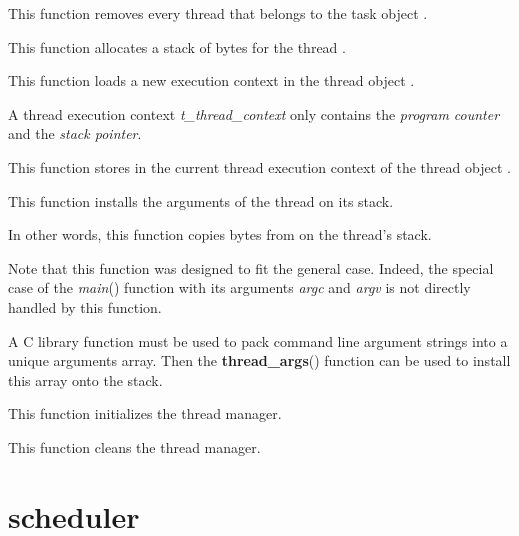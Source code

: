 	 {
	   This function removes every thread that belongs to the
	   task object .
	 }

	 {
	   This function allocates a stack of  bytes
	   for the thread .
	 }

	 {
	   This function loads a new execution context in the thread
	   object .

	   A thread execution context \textit{t\_thread\_context}
	   only contains the \textit{program counter} and the
	   \textit{stack pointer}.
	 }

	 {
	   This function stores in  the current
	   thread execution context of the thread object .
	 }

	 {
	   This function installs the arguments of the thread 
	   on its stack.

	   In other words, this function copies  bytes
	   from  on the thread's stack.

	   Note that this function was designed to fit the general case.
	   Indeed, the special case of the \textit{main}() function
	   with its arguments \textit{argc} and \textit{argv} is not
	   directly handled by this function.

	   A C library function must be used to pack command line
	   argument strings into a unique arguments array. Then the
	   \textbf{thread\_args}() function can be used to install
	   this array onto the stack.
	 }

	 {
	   This function initializes the thread manager.
	 }

	 {
	   This function cleans the thread manager.
	 }

%
%

\section{scheduler}

